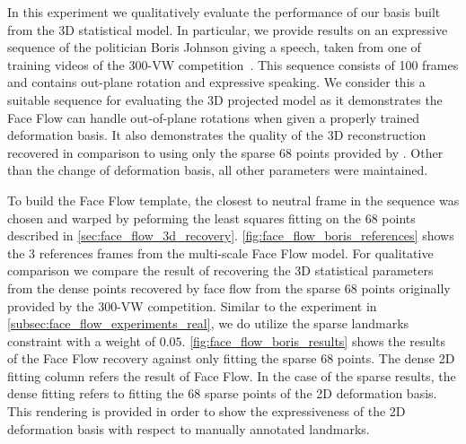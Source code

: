 In this experiment we qualitatively evaluate the performance of our basis
built from the 3D statistical model. In particular, we provide results on
an expressive sequence of the politician Boris Johnson giving a speech, taken
from one of training videos of the 
300-VW competition~\cite{Chrysos:2015gt,shen2015first}. This sequence consists
of 100 frames and contains out-plane rotation and expressive speaking. We
consider this a suitable sequence for evaluating the 3D projected model
as it demonstrates the Face Flow can handle out-of-plane rotations when
given a properly trained deformation basis. It also demonstrates the quality
of the 3D reconstruction recovered in comparison to using only the sparse
68 points provided by \citet{shen2015first}. Other than the change of deformation
basis, all other parameters were maintained.

To build the Face Flow template, the closest to neutral frame in the sequence 
was chosen and warped by peforming the least squares fitting on the 68 
points described in \cref{sec:face_flow_3d_recovery}. 
\cref{fig:face_flow_boris_references} shows the 3 references frames from 
the multi-scale Face Flow model. For qualitative comparison we compare the result
of recovering the 3D statistical parameters from the dense points recovered by
face flow from the sparse 68 points originally provided by the 300-VW competition.
Similar to the experiment in \cref{subsec:face_flow_experiments_real}, we do
utilize the sparse landmarks constraint with a weight of $0.05$. 
\cref{fig:face_flow_boris_results} shows the results of the Face Flow recovery
against only fitting the sparse 68 points. The dense 2D fitting column refers
the result of Face Flow. In the case of the sparse results, the dense fitting
refers to fitting the 68 sparse points of the 2D deformation basis. This
rendering is provided in order to show the expressiveness of the 2D deformation
basis with respect to manually annotated landmarks.

